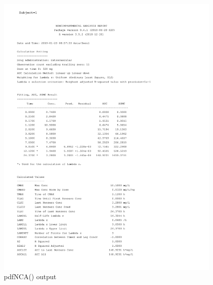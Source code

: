 \documentclass[9pt,]{krantz}
\begin{document}
\begin{figure}
\includegraphics[width=17.71in]{Output-ncar/pdfNCA-Theoph-01} \caption{pdfNCA() output}\label{fig:pdfnca-output1}
\end{figure}
\end{document}
